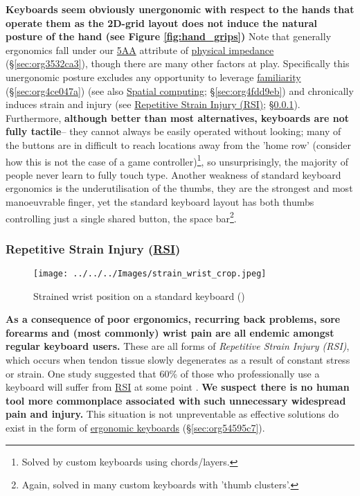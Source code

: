 \documentclass[logo,bsc,singlespacing,parskip]{infthesis}
\begin{document}
\textbf{Keyboards seem obviously unergonomic with respect to the hands that operate them as the 2D-grid layout does not induce the natural posture of the hand (see Figure \ref{fig:hand_grips})}
Note that generally ergonomics fall under our \hyperref[org7b75b93]{5AA} attribute of \hyperref[sec:org3532ca3]{physical impedance} (\S \ref{sec:org3532ca3}), though there are many other factors at play.
Specifically this unergonomic posture excludes any opportunity to leverage \hyperref[sec:org4ce047a]{familiarity} (\S \ref{sec:org4ce047a})
(see also \hyperref[sec:org4fdd9eb]{Spatial computing}; \S \ref{sec:org4fdd9eb}) and chronically induces strain and injury (see \hyperref[sec:orgf363e6b]{Repetitive Strain Injury (RSI)}; \S \ref{sec:orgf363e6b}).
Furthermore, \textbf{although better than most alternatives, keyboards are not fully tactile}-- they cannot always be easily operated without looking; many of the buttons are in difficult to reach locations away from the 'home row' (consider how this is not the case of a game controller)\footnote{Solved by custom keyboards using chords/layers.}, so unsurprisingly, the majority of people never learn to fully touch type.
Another weakness of standard keyboard ergonomics is the underutilisation of the thumbs,  they are the strongest and most manoeuvrable finger, yet the standard keyboard layout has both thumbs controlling just a single shared button, the space bar\footnote{Again, solved in many custom keyboards with 'thumb clusters'.}.

\subsubsection{Repetitive Strain Injury (\hyperref[org503fc2d]{RSI})}
\label{sec:orgf363e6b}
\begin{figure}[h]
\centering
\texttt{[image: ../../../Images/strain\_wrist\_crop.jpeg]}
\caption{Strained wrist position on a standard keyboard (\autocite{ZergoFreedomErgonomics})}
\end{figure}

\textbf{As a consequence of  poor ergonomics, recurring back problems, sore forearms and (most commonly) wrist pain are all endemic amongst regular keyboard users.}
These are all forms of \emph{Repetitive Strain Injury (\label{org503fc2d}RSI)}, which   occurs when tendon tissue slowly degenerates as a result of constant stress or strain.
One study suggested that 60\% of those who professionally use a keyboard will suffer from \hyperref[org503fc2d]{RSI} at some point \autocite{namayandegiEVALUATIONMETHODWHICH2015}.
\textbf{We suspect there is no human tool more commonplace associated with such unnecessary widespread pain and injury.}
This situation is not unpreventable as effective solutions do exist in the form of \hyperref[sec:org54595c7]{ergonomic keyboards} (\S \ref{sec:org54595c7}).
\end{document}
